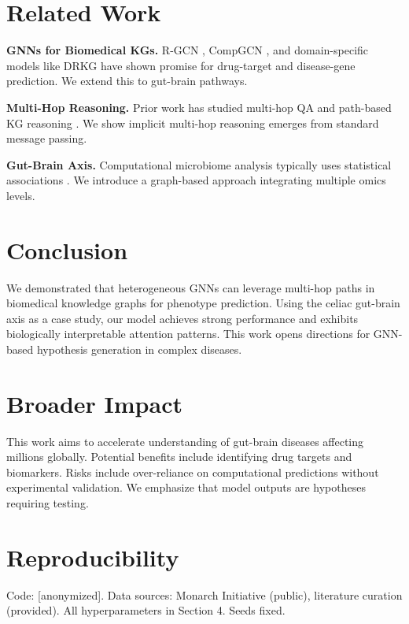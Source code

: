 \documentclass{article}
\begin{document}
\section{Related Work}

\textbf{GNNs for Biomedical KGs.} R-GCN \citep{schlichtkrull2018rgcn}, CompGCN \citep{vashishth2020compgcn}, and domain-specific models like DRKG \citep{ioannidis2020drkg} have shown promise for drug-target and disease-gene prediction. We extend this to gut-brain pathways.

\textbf{Multi-Hop Reasoning.} Prior work has studied multi-hop QA \citep{yang2018hotpotqa} and path-based KG reasoning \citep{das2018minerva}. We show implicit multi-hop reasoning emerges from standard message passing.

\textbf{Gut-Brain Axis.} Computational microbiome analysis typically uses statistical associations \citep{lloyd2019multi}. We introduce a graph-based approach integrating multiple omics levels.

\section{Conclusion}

We demonstrated that heterogeneous GNNs can leverage multi-hop paths in biomedical knowledge graphs for phenotype prediction. Using the celiac gut-brain axis as a case study, our model achieves strong performance and exhibits biologically interpretable attention patterns. This work opens directions for GNN-based hypothesis generation in complex diseases.

\section*{Broader Impact}

This work aims to accelerate understanding of gut-brain diseases affecting millions globally. Potential benefits include identifying drug targets and biomarkers. Risks include over-reliance on computational predictions without experimental validation. We emphasize that model outputs are hypotheses requiring testing.

\section*{Reproducibility}

Code: [anonymized]. Data sources: Monarch Initiative (public), literature curation (provided). All hyperparameters in Section 4. Seeds fixed.



\end{document}
